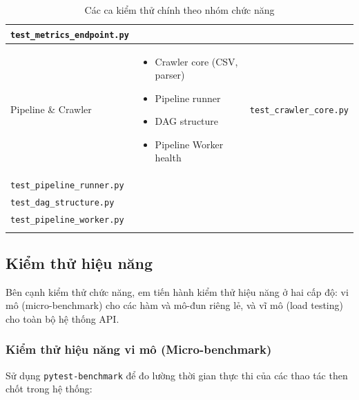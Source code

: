 \begin{longtable}{|p{3.5cm}|p{5cm}|p{5cm}|}
    \texttt{test\_metrics\_endpoint.py} \\
    \hline
    Pipeline \& Crawler & 
    \begin{itemize}
        \item Crawler core (CSV, parser)
        \item Pipeline runner
        \item DAG structure
        \item Pipeline Worker health
    \end{itemize} & 
    \texttt{test\_crawler\_core.py} \\
    \texttt{test\_pipeline\_runner.py} \\
    \texttt{test\_dag\_structure.py} \\
    \texttt{test\_pipeline\_worker.py} \\
    \hline
    \caption{Các ca kiểm thử chính theo nhóm chức năng}
    \label{tab:test-cases}
\end{longtable}

\subsection{Kiểm thử hiệu năng}

Bên cạnh kiểm thử chức năng, em tiến hành kiểm thử hiệu năng ở hai cấp độ: vi mô (micro-benchmark) cho các hàm và mô-đun riêng lẻ, và vĩ mô (load testing) cho toàn bộ hệ thống API.

\subsubsection*{Kiểm thử hiệu năng vi mô (Micro-benchmark)}

Sử dụng \texttt{pytest-benchmark} để đo lường thời gian thực thi của các thao tác then chốt trong hệ thống:

